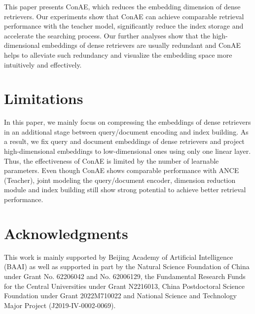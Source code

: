 \documentclass[11pt]{article}
\begin{document}
This paper presents ConAE, which reduces the embedding dimension of dense retrievers. Our experiments show that ConAE can achieve comparable retrieval performance with the teacher model, significantly reduce the index storage and accelerate the searching process. Our further analyses show that the high-dimensional embeddings of dense retrievers are usually redundant and ConAE helps to alleviate such redundancy and visualize the embedding space more intuitively and effectively. \section*{Limitations}
In this paper, we mainly focus on compressing the embeddings of dense retrievers in an additional stage between query/document encoding and index building. As a result, we fix query and document embeddings of dense retrievers and project high-dimensional embeddings to low-dimensional ones using only one linear layer. Thus, the effectiveness of ConAE is limited by the number of learnable parameters. Even though ConAE shows comparable performance with ANCE (Teacher), joint modeling the query/document encoder, dimension reduction module and index building still show strong potential to achieve better retrieval performance.
 \section*{Acknowledgments}
This work is mainly supported by Beijing Academy of Artificial Intelligence (BAAI) as well as supported in part by the Natural Science Foundation of China under Grant No. 62206042 and No. 62006129, the Fundamental Research Funds for the Central Universities under Grant N2216013, China Postdoctoral Science Foundation under Grant 2022M710022 and National Science and Technology Major Project (J2019-IV-0002-0069).



\end{document}
